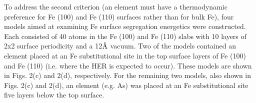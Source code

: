 To address the second criterion (an element must have a thermodynamic preference for Fe (100) and Fe (110) surfaces rather than for bulk Fe), four models aimed at examining Fe surface segregation energetics were constructed. Each consisted of 40 atoms in the Fe (100) and Fe (110) slabs with 10 layers of 2x2 surface periodicity and a 12$\mbox{\normalfont\AA}$ vacuum.  Two of the models contained an element placed at an Fe substitutional site in the top surface layers of Fe (100) and Fe (110) (i.e. where the \ac{HER} is expected to occur). These models are shown in Figs. 2(c) and 2(d), respectively. For the remaining two models, also shown in Figs. 2(c) and 2(d), an element (e.g. As) was placed at an Fe substitutional site five layers below the top surface.

\newpage
\begingroup
\begin{figure}[!ht]
  \centering
  \label{Chap:Mg_H:fig:5a}
  \label{Chap:Mg_H:fig:5b}
  \\
  \label{Chap:Mg_H:fig:5c}
  \label{Chap:Mg_H:fig:5d}

\end{figure}
